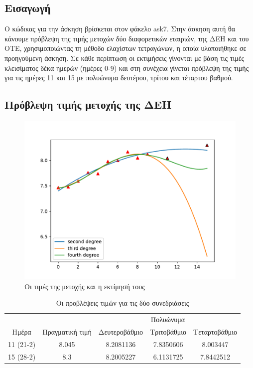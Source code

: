 \documentclass[a4paper,11pt]{article}
\newcommand{\lt}{\latintext}
\newcommand{\gt}{\greektext}
\begin{document}
\subsection{Εισαγωγή}

\gt Ο κώδικας για την άσκηση βρίσκεται στον φάκελο \lt ask7. \gt Στην άσκηση αυτή θα κάνουμε πρόβλεψη της τιμής μετοχών δύο διαφορετικών εταιριών, της ΔΕΗ και του ΟΤΕ, χρησιμοποιώντας τη μέθοδο ελαχίστων τετραγώνων, η οποία υλοποιήθηκε σε προηγούμενη άσκηση. Σε κάθε περίπτωση οι εκτιμήσεις γίνονται με βάση τις τιμές κλεισίματος δέκα ημερών (ημέρες 0-9) και στη συνέχεια γίνεται πρόβλεψη της τιμής για τις ημέρες 11 και 15 με πολυώνυμα δευτέρου, τρίτου και τέταρτου βαθμού. 

\subsection{Πρόβλεψη τιμής μετοχής της ΔΕΗ}

\begin{figure}[h!]
    \centering
    \includegraphics[width=0.8\linewidth]{images/figure7_dei.pdf}
    \centering
     \caption{Οι τιμές της μετοχής και η εκτίμησή τους}
    \label{fig:fig7dei}
\end{figure}

\begin{table}[ht]
\centering
\begin{tabular}{c c| c c c}
    & & \multicolumn{3}{c}{Πολυώνυμα} \\
   Ημέρα & Πραγματική τιμή & Δευτεροβάθμιο & Τριτοβάθμιο & Τεταρτοβάθμιο \\
   11 (21-2) & 8.045 & 8.2081136 & 7.8350606 & 8.003447 \\
   15 (28-2) & 8.3 & 8.2005227 & 6.1131725 & 7.8442512 \\
\end{tabular}
\caption{Οι προβλέψεις τιμών για τις δύο συνεδριάσεις}
\label{fig:table7a}
\end{table}
\end{document}
